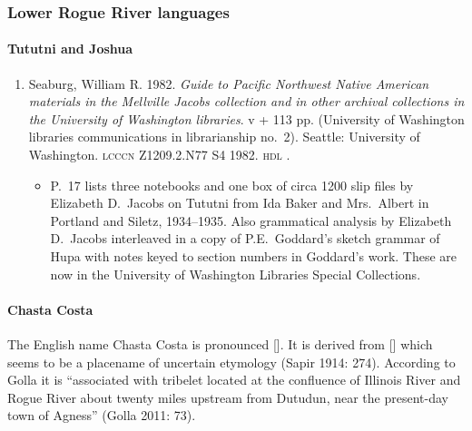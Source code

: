 \documentclass[12pt,letterpaper,oneside,article]{memoir}
\begin{document}
\subsubsection{Lower Rogue River languages}\label{sec:pacific-oregon-lowerrogue}

\paragraph{Tututni and Joshua}\label{sec:tututni}

\begin{enumerate}
\item	Seaburg, William R.
	1982.
	\textit{Guide to Pacific Northwest Native American materials in the Mellville Jacobs
		collection and in other archival collections in the University of Washington
		libraries}.
	v + 113 pp.
	(University of Washington libraries communications in librarianship no.\ 2).
	Seattle: University of Washington.
	\textsc{lcccn} Z1209.2.N77 S4 1982.
	\textsc{hdl} .
	\begin{itemize}
	\item	P.\ 17 lists three notebooks and one box of circa 1200 slip files by
		Elizabeth D.\ Jacobs on Tututni from Ida Baker and Mrs.\ Albert in
		Portland and Siletz, 1934–1935.
		Also grammatical analysis by Elizabeth D.\ Jacobs interleaved in a copy of
		P.E.\ Goddard’s sketch grammar of Hupa with notes keyed to section numbers in
		Goddard’s work.
		These are now in the University of Washington Libraries Special Collections.
	\end{itemize}
\end{enumerate}

\paragraph{Chasta Costa}\label{sec:chastacosta}

The English name Chasta Costa is pronounced [].
It is derived from  [] which seems to be a placename of uncertain etymology (Sapir 1914: 274).
According to Golla it is “associated with tribelet located at the confluence of Illinois River and Rogue River about twenty miles upstream from Dutudun, near the present-day town of Agness” (Golla 2011: 73).
\end{document}
